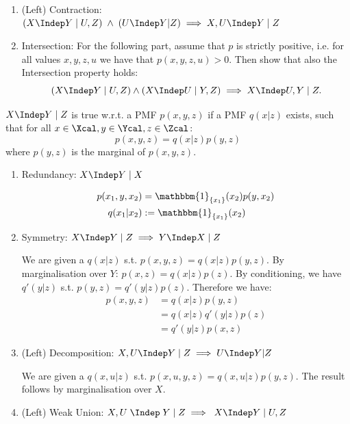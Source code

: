 \begin{enumerate}
\begin{enumerate}
    \item (Left) Contraction: $(X \Indep Y\; |\; U, Z) \; \land \; (U \Indep Y | Z) \implies X, U \Indep Y \; | \; Z$ \\

    \item Intersection: For the following part, assume that $p$ is strictly positive, i.e. for all values $x,y,z,u$ we have that $p(x, y, z, u) > 0$. Then show that also the Intersection property holds:
    $$(X \Indep Y \;|\;U,Z) \land (X \Indep U \; | \; Y,Z)  \implies  X \Indep U,Y \; | \; Z.$$
  \end{enumerate}

  \begin{ungradedsolution}
    $X \Indep Y \; | \; Z$ is true w.r.t. a PMF $p(x, y, z)$ if a PMF $q(x|z)$ exists, such that for all $x \in \Xcal, y \in \Ycal, z \in \Zcal$:
    \[
      p(x,y,z)=q(x|z)p(y,z)
    \]
    where $p(y,z)$ is the marginal of $p(x,y,z)$.
    \begin{enumerate}
      \item Redundancy: $X \Indep Y \;|\; X$

      \begin{align*}
        p(x_1,y,x_2) & =\mathbbm{1}_{\{x_1\}}(x_2)p(y, x_2) \\
        q(x_1|x_2)   & :=\mathbbm{1}_{\{x_1\}}(x_2)
      \end{align*}

      \item Symmetry: $X \Indep Y\; |\; Z \implies Y \Indep X\; |\; Z$

      We are given a $q(x|z)$ s.t. $p(x,y,z)=q(x|z)p(y,z)$. By marginalisation over $Y$: $p(x, z)=q(x|z)p(z)$. By conditioning, we have $q'(y|z)$ s.t. $p(y,z)=q'(y|z)p(z)$. Therefore we have:
      \begin{align*}
        p(x,y,z)
         & =q(x|z)p(y,z)      \\
         & =q(x|z)q'(y|z)p(z) \\
         & =q'(y|z)p(x,z)
      \end{align*}

      \item (Left) Decomposition: $X, U \Indep Y \; | \; Z \implies U \Indep Y | Z\; $

      We are given a $q(x,u|z)$ s.t. $p(x, u, y, z)=q(x, u|z)p(y, z)$.
      The result follows by marginalisation over $X$.

      \item (Left) Weak Union: $X,U \;\Indep \;  Y \; | \; Z \implies  \; X \Indep Y \; |\; U,Z $


\end{enumerate}
\end{ungradedsolution}
\end{enumerate}
